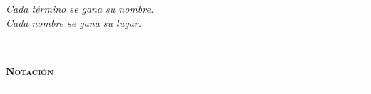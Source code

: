 \documentclass[10pt, openany, oneside]{book}
\renewcommand{\normalsize}{\fontsize{10}{13}\selectfont}
\begin{document}
\vspace{1.5em}

\begin{center}
    \itshape
    Cada término se gana su nombre.\\
    Cada nombre se gana su lugar.
\end{center}

\vspace{2em}


\begin{center}
    \rule{0.3\textwidth}{0.4pt}\\[0.5em]
    {\normalsize\bfseries\scshape Notación}\\[0.3em]
    \rule{0.3\textwidth}{0.4pt}
\end{center}

\vspace{1em}
\end{document}
